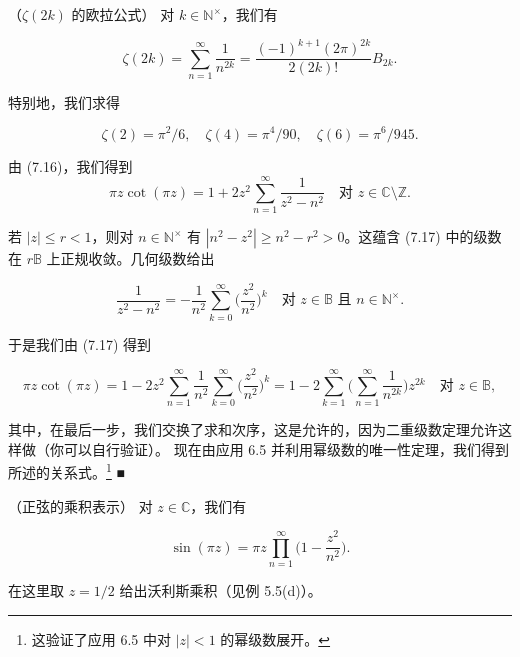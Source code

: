 \begin{application}

\begin{items}
\item

（$ \zeta(2k) $ 的欧拉公式）  对 $ k \in \mathbb{N}^{\times} $，我们有

\[
\zeta(2k) = \sum_{n=1}^{\infty}\frac{1}{n^{2k}} = \frac{(-1)^{k+1}(2\pi)^{2k}}{2(2k)!}B_{2k} .
\]

特别地，我们求得

\[
\zeta(2) = \pi^{2}/6 , \quad \zeta(4) = \pi^{4}/90 , \quad \zeta(6) = \pi^{6}/945 .
\]

\proofhead
由 (7.16)，我们得到
\begin{equation}
\pi z\cot(\pi z) = 1 + 2z^{2}\sum_{n=1}^{\infty}\frac{1}{z^{2} - n^{2}} \quad \text{对 } z \in \mathbb{C} \setminus \mathbb{Z} .\tag{7.17}
\end{equation}

若 $ |z| \le r < 1 $，则对 $ n \in \mathbb{N}^{\times} $ 有 $ |n^{2} - z^{2}| \ge n^{2} - r^{2} > 0 $。这蕴含 (7.17) 中的级数在 $ r\mathbb{B} $ 上正规收敛。几何级数给出

\[
\frac{1}{z^{2} - n^{2}} = -\frac{1}{n^{2}}\sum_{k=0}^{\infty}\Big(\frac{z^{2}}{n^{2}}\Big)^{k} \quad \text{对 } z \in \mathbb{B} \text{ 且 } n \in \mathbb{N}^{\times} .
\]

于是我们由 (7.17) 得到

\begin{equation}
\pi z\cot(\pi z) = 1 - 2z^{2}\sum_{n=1}^{\infty}\frac{1}{n^{2}}\sum_{k=0}^{\infty}\Big(\frac{z^{2}}{n^{2}}\Big)^{k} = 1 - 2\sum_{k=1}^{\infty}\Big(\sum_{n=1}^{\infty}\frac{1}{n^{2k}}\Big)z^{2k} \quad \text{对 } z \in \mathbb{B} ,\tag{7.18}
\end{equation}

其中，在最后一步，我们交换了求和次序，这是允许的，因为二重级数定理允许这样做（你可以自行验证）。
现在由应用 6.5 并利用幂级数的唯一性定理，我们得到所述的关系式。\footnote{这验证了应用 6.5 中对 $ |z| < 1 $ 的幂级数展开。} \nobreak\hspace{0.35em}■

\item

（正弦的乘积表示）  对 $ z \in \mathbb{C} $，我们有

\[
\sin(\pi z) = \pi z\prod_{n=1}^{\infty}\Big(1 - \frac{z^{2}}{n^{2}}\Big) .
\]

在这里取 $ z = 1/2 $ 给出沃利斯乘积（见例 5.5(d)）。


\end{items}
\end{application}
